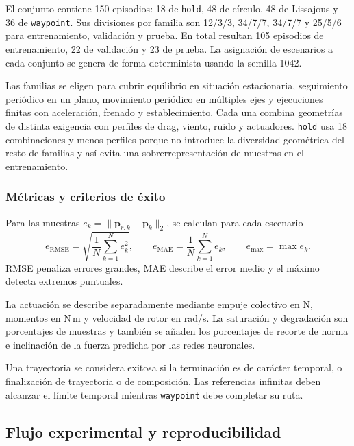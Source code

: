 El conjunto contiene 150 episodios: 18 de \texttt{hold}, 48 de círculo, 48 de
Lissajous y 36 de \texttt{waypoint}. Sus divisiones por familia son
12/3/3, 34/7/7, 34/7/7 y 25/5/6 para entrenamiento, validación y prueba. En
total resultan 105 episodios de entrenamiento, 22 de validación y 23 de prueba.
La asignación de escenarios a cada conjunto se genera de forma determinista usando la semilla 1042.

Las familias se eligen para cubrir equilibrio en situación estacionaria, seguimiento
periódico en un plano, movimiento periódico en múltiples ejes y ejecuciones finitas con
aceleración, frenado y establecimiento. Cada una combina geometrías de distinta
exigencia con perfiles de drag, viento, ruido y actuadores. \texttt{hold} usa 18
combinaciones y menos perfiles porque no introduce la
diversidad geométrica del resto de familias y así evita una sobrerrepresentación
de muestras en el entrenamiento.

\subsubsection*{Métricas y criterios de éxito}
\label{subsubsec:metricas-criterios}

Para las muestras $e_k=\|\bm{p}_{r,k}-\bm{p}_k\|_2$, se calculan para cada escenario
\begin{equation}
 e_{\mathrm{RMSE}}=\sqrt{\frac{1}{N}\sum_{k=1}^{N} e_k^2},\qquad
 e_{\mathrm{MAE}}=\frac{1}{N}\sum_{k=1}^{N} e_k,\qquad
 e_{\max}=\max e_k.
\end{equation}
RMSE penaliza errores grandes, MAE describe el error medio y el máximo
detecta extremos puntuales.

La actuación se describe separadamente mediante empuje colectivo en N, momentos
en N\,m y velocidad de rotor en rad/s. La saturación y degradación son
porcentajes de muestras y también se añaden los porcentajes de recorte de
norma e inclinación de la fuerza predicha por las redes neuronales.

Una trayectoria se considera exitosa si la terminación es de carácter temporal,
o finalización de trayectoria o de composición. Las referencias infinitas deben
alcanzar el límite temporal mientras \texttt{waypoint} debe completar su ruta.

\subsection{Flujo experimental y reproducibilidad}
\label{subsec:flujo-reproducibilidad}

